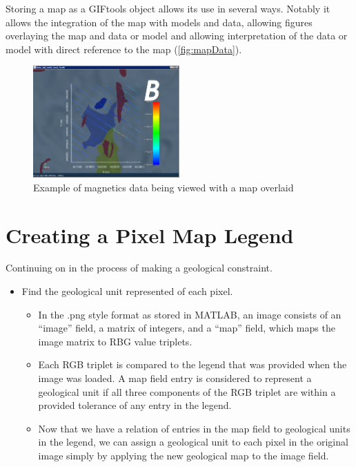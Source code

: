 Storing a map as a GIFtools object allows its use in several ways. Notably it allows the integration of the map with models and data, allowing figures overlaying the map and data or model and allowing interpretation of the data or model with direct reference to the map (\autoref{fig:mapData}).
\begin{figure} [h]
    \centering
    \includegraphics[width=0.5\textwidth]{images/MaptoModel/mapData.PNG}
    \caption{Example of magnetics data being viewed with a map overlaid }
    \label{fig:mapData}
\end{figure}



\section{Creating a Pixel Map Legend}
\label{sec:Create Pixel Map Legend}

Continuing on in the process of making a geological constraint.
\begin{itemize}
\item Find the geological unit represented of each pixel.
\begin{itemize}
	\item In the .png style format as stored in MATLAB, an image consists of an ``image'' field, a matrix of integers, and a ``map'' field, which maps the image matrix to RBG value triplets.
	\item Each RGB triplet is compared to the legend that was provided when the image was loaded. A map field entry is considered to represent a geological unit if all three components of the RGB triplet are within a provided tolerance of any entry in the legend.
	\item Now that we have a relation of entries in the map field to geological units in the legend, we can assign a geological unit to each pixel in the original image simply by applying the new geological map to the image field.
\end{itemize}
\end{itemize}

